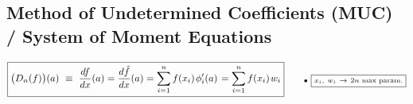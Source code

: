 \documentclass[12pt]{article}
\newcommand{\hs}{\hspace{1pt}}
\begin{document}
\subsection{\small Method of Undetermined Coefficients (MUC) / System of Moment Equations}  

\(\displaystyle
    \boxed{ \big( D_n(f) \big) (a)
        \ \equiv\ \frac{d f}{dx}(a)
        = \frac{d\hat{f}}{dx}(a)
        = \sum_{i=1}^n f(x_i) \hs \phi'_i(a)\hs
        = \sum_{i=1}^n f(x_i)\hs w_i
        }
        \hspace{20pt} \begin{aligned}
            &{\scriptstyle \bullet\ \boxed{\scriptstyle x_i,\ w_i \ \rightarrow\ 2n \text{\scriptsize\ max param.} } }\\[-4pt]
        \end{aligned}
\)
\end{document}
